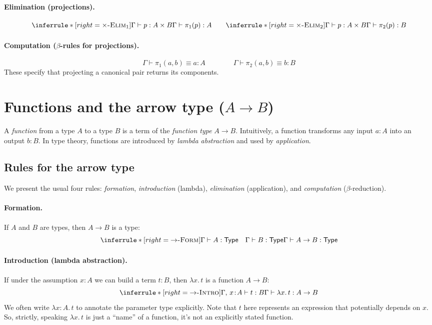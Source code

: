 \documentclass{article}
\newcommand{\Type}{\ensuremath{\mathsf{Type}}}
\newcommand{\judg}[3]{#1 \vdash #2 : #3}   %
\newcommand{\jdeq}{\equiv}                 %
\newcommand{\teq}[4]{#1 \vdash #2 \jdeq #3 : #4} %
\newcommand{\rulename}[1]{\textsc{#1}}
\begin{document}
\paragraph{Elimination (projections).}
\[
\inferrule*[right=\rulename{\(\times\)-Elim\(_1\)}]{
  \judg{\Gamma}{p}{A \times B}
}{
  \judg{\Gamma}{\pi_1(p)}{A}
}
\qquad
\inferrule*[right=\rulename{\(\times\)-Elim\(_2\)}]{
  \judg{\Gamma}{p}{A \times B}
}{
  \judg{\Gamma}{\pi_2(p)}{B}
}
\]

\paragraph{Computation (\(\beta\)-rules for projections).}
\[
\teq{\Gamma}{\pi_1(a,b)}{a}{A}
\qquad\qquad
\teq{\Gamma}{\pi_2(a,b)}{b}{B}
\]
These specify that projecting a canonical pair returns its components.

\section{Functions and the arrow type \texorpdfstring{(\(A \to B\))}{(A -> B)}}

A \emph{function} from a type \(A\) to a type \(B\) is a term of the
\emph{function type} \(A \to B\). Intuitively, a function transforms any input \(a:A\)
into an output \(b:B\). In type theory, functions are introduced by
\emph{lambda abstraction} and used by \emph{application}.

\subsection*{Rules for the arrow type}

We present the usual four rules: \emph{formation}, \emph{introduction} (lambda),
\emph{elimination} (application), and \emph{computation} (\(\beta\)-reduction).

\paragraph{Formation.}
If \(A\) and \(B\) are types, then \(A \to B\) is a type:
\[
\inferrule*[right=\rulename{\(\to\)-Form}]{
  \judg{\Gamma}{A}{\Type}
  \quad
  \judg{\Gamma}{B}{\Type}
}{
  \judg{\Gamma}{A \to B}{\Type}
}
\]

\paragraph{Introduction (lambda abstraction).}
If under the assumption \(x:A\) we can build a term \(t:B\), then
\(\lambda x.\,t\) is a function \(A \to B\):
\[
\inferrule*[right=\rulename{\(\to\)-Intro}]{
  \judg{\Gamma,\,x\!:\!A}{t}{B}
}{
  \judg{\Gamma}{\lambda x.\,t}{A \to B}
}
\]
We often write \(\lambda x:A.\,t\) to annotate the parameter type explicitly. Note that $t$ here represents an expression that potentially depends on $x$. So, strictly, speaking $\lambda x.\,t$ is just a ``name'' of a function, it's not an explicitly stated function.
\end{document}
